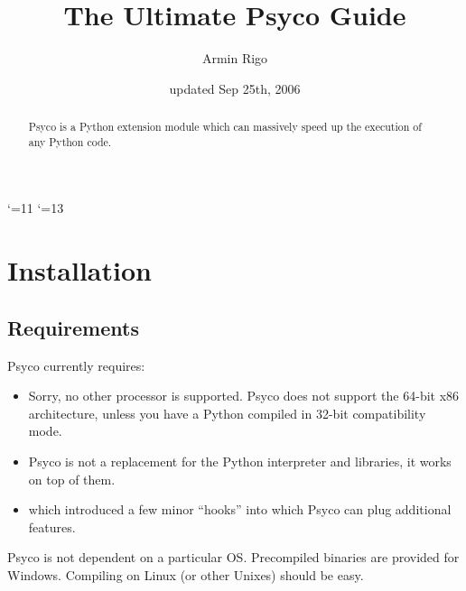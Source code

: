 \documentclass{manual}
\title{The Ultimate Psyco Guide}
\author{Armin Rigo}
\date{updated Sep 25th, 2006}
\begin{document}
\catcode`\@=11
\renewcommand{\py@reset}{}
\catcode`\@=13

\maketitle


\begin{abstract}

\noindent
Psyco is a Python extension module which can massively speed up the execution of any Python code.


\end{abstract}

\tableofcontents


\chapter{Installation}

\section{Requirements}\label{req}

Psyco currently requires:

\begin{itemize}
  
\item {}  Sorry, no other processor is supported.  Psyco does not support the 64-bit x86 architecture, unless you have a Python compiled in 32-bit compatibility mode.
  
\item {}  Psyco is not a replacement for the Python interpreter and libraries, it works on top of them.
  
\item {} which introduced a few minor ``hooks'' into which Psyco can plug additional features.
  
\end{itemize}

Psyco is not dependent on a particular OS.  Precompiled binaries are provided for Windows.  Compiling on Linux (or other Unixes) should be easy.
\end{document}
